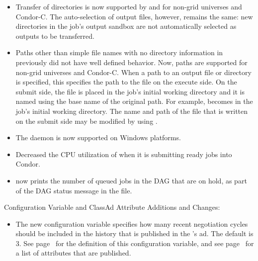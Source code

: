 \begin{itemize}

\item Transfer of directories is now supported by
   and
   for non-grid universes and
  Condor-C.  The auto-selection of output files, however, remains the
  same: new directories in the job's output sandbox are not
  automatically selected as outputs to be transferred.

\item Paths other than simple file names with no directory information
  in  previously did not have well
  defined behavior.  Now, paths are supported for non-grid universes
  and Condor-C.  When a path to an output file or directory is
  specified, this specifies the path to the file on the execute side.
  On the submit side, the file is placed in the job's initial working
  directory and it is named using the base name of the original path.
  For example,  becomes 
  in the job's initial working directory.  The name and path of the
  file that is written on the submit side may be modified by using
  .

\item The  daemon is now supported on Windows platforms.

\item Decreased the CPU utilization of  when it is
	submitting ready jobs into Condor.

\item {} now prints the number of queued jobs in the DAG
that are on hold,
as part of the DAG status message in the  file.

\end{itemize}

\noindent Configuration Variable and ClassAd Attribute Additions and Changes:

\begin{itemize}

\item The new configuration variable
   specifies how many
  recent negotiation cycles should be included in the history that is
  published in the 's ad.  The default is 3.  See
  page~\pageref{param:NegotiationCycleStatsLength} for the
  definition of this configuration variable, and see
  page~\pageref{attr:LastNegotiationCycleActiveSubmitterCount<X>} for a
  list of attributes that are published.

\end{itemize}

